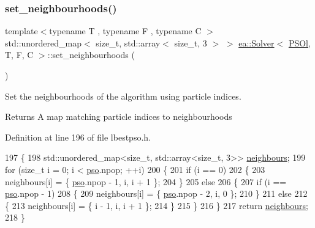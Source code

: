 \subsubsection{\texorpdfstring{set\+\_\+neighbourhoods()}{set\_neighbourhoods()}}
{\footnotesize\ttfamily template$<$typename T , typename F , typename C $>$ \\
std\+::unordered\+\_\+map$<$ size\+\_\+t, std\+::array$<$ size\+\_\+t, 3 $>$ $>$ \hyperlink{classea_1_1_solver}{ea\+::\+Solver}$<$ \hyperlink{structea_1_1_p_s_ol}{P\+S\+Ol}, T, F, C $>$\+::set\+\_\+neighbourhoods (\begin{DoxyParamCaption}{ }\end{DoxyParamCaption})\hspace{0.3cm}{\ttfamily [private]}}



Set the neighbourhoods of the algorithm using particle indices. 

\begin{DoxyReturn}{Returns}
A map matching particle indices to neighbourhoods 
\end{DoxyReturn}


Definition at line 196 of file lbestpso.\+h.


\begin{DoxyCode}
197     \{
198         std::unordered\_map<size\_t, std::array<size\_t, 3>> \hyperlink{classea_1_1_solver_3_01_p_s_ol_00_01_t_00_01_f_00_01_c_01_4_ab92e8a0460092b8264bd9023a3455257}{neighbours};
199         \textcolor{keywordflow}{for} (\textcolor{keywordtype}{size\_t} i = 0; i < \hyperlink{classea_1_1_solver_3_01_p_s_ol_00_01_t_00_01_f_00_01_c_01_4_a3098f083ef04a0ce7ae0eef22dd80442}{pso}.npop; ++i)
200         \{
201             \textcolor{keywordflow}{if} (i == 0)
202             \{
203                 neighbours[i] = \{ \hyperlink{classea_1_1_solver_3_01_p_s_ol_00_01_t_00_01_f_00_01_c_01_4_a3098f083ef04a0ce7ae0eef22dd80442}{pso}.npop - 1, i, i + 1 \};
204             \}
205             \textcolor{keywordflow}{else}
206             \{
207                 \textcolor{keywordflow}{if} (i == \hyperlink{classea_1_1_solver_3_01_p_s_ol_00_01_t_00_01_f_00_01_c_01_4_a3098f083ef04a0ce7ae0eef22dd80442}{pso}.npop - 1)
208                 \{
209                     neighbours[i] = \{ \hyperlink{classea_1_1_solver_3_01_p_s_ol_00_01_t_00_01_f_00_01_c_01_4_a3098f083ef04a0ce7ae0eef22dd80442}{pso}.npop - 2, i, 0 \};
210                 \}
211                 \textcolor{keywordflow}{else}
212                 \{
213                     neighbours[i] = \{ i - 1, i, i + 1 \};
214                 \}
215             \}
216         \}
217         \textcolor{keywordflow}{return} \hyperlink{classea_1_1_solver_3_01_p_s_ol_00_01_t_00_01_f_00_01_c_01_4_ab92e8a0460092b8264bd9023a3455257}{neighbours};
218     \}
\end{DoxyCode}


